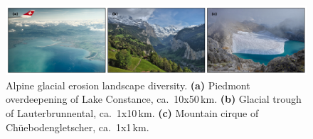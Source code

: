 \documentclass[utf8]{article}
\begin{document}







\clearpage

    \begin{figure}
      \centerline{\includegraphics{alpero_landscape}}
      \caption{%
        Alpine glacial erosion landscape diversity.
        \textbf{(a)} Piedmont overdeepening of Lake Constance, ca.~10x50\,km.
        \textbf{(b)} Glacial trough of Lauterbrunnental, ca.~1x10\,km.
        \textbf{(c)} Mountain cirque of Chüebodengletscher, ca.~1x1\,km.}
      \label{fig:landscape}
    \end{figure}
\end{document}
